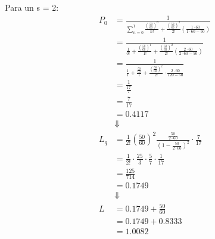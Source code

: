\documentclass{templateNote}
\begin{document}
    Para un s = 2:
    \begin{align*}
        P_0 &= \frac{1}{\sum_{n=0}^{1} \frac{(\frac{50}{60})^n}{n!} + \frac{(\frac{50}{60})^2}{2!} (\frac{1\cdot60}{1\cdot60-50})} \\
        &= \frac{1}{\frac{1}{0!} + \frac{(\frac{50}{60})^1}{1!} + \frac{(\frac{50}{60})^2}{2!} (\frac{2\cdot60}{2\cdot60-50})} \\
        &= \frac{1}{\frac{1}{1}+\frac{\frac{50}{60}}{1}+\frac{(\frac{50}{60})^2}{2!}\cdot\frac{2\cdot60}{120-50}} \\
        &= \frac{1}{\frac{17}{7}} \\
        &= \frac{7}{17} \\
        &= 0.4117 \\
        &\Downarrow \\
        L_q &= \frac{1}{2!} (\frac{50}{60})^2 \frac{\frac{50}{2\cdot60}}{(1-\frac{50}{2\cdot60})^2} \cdot \frac{7}{17} \\
        &= \frac{1}{2!} \cdot \frac{25}{3} \cdot \frac{5}{7} \cdot \frac{1}{17} \\
        &= \frac{125}{714} \\
        &= 0.1749 \\
        &\Downarrow \\
        L &= 0.1749 + \frac{50}{60} \\
        &= 0.1749 + 0.8333 \\
        &= 1.0082
    \end{align*}
\end{document}
